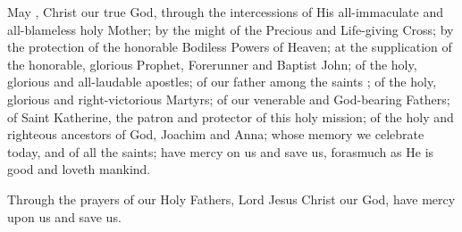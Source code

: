 \documentclass[twoside, letterpaper, 12pt]{report}
\begin{document}
\begin{priest}
\item May , Christ our true God, through the intercessions of His
    all-immaculate and all-blameless holy Mother; by the might of the Precious and Life-giving Cross;
    by the protection of the honorable Bodiless Powers of Heaven;
    at the supplication of the honorable, glorious Prophet, Forerunner and Baptist John;
    of the holy, glorious and all-laudable apostles;
    of our father among the saints
      ;
    of the holy, glorious and right-victorious Martyrs;
    of our venerable and God-bearing Fathers;
    of Saint Katherine, the patron and protector of this holy mission;
    of the holy and righteous ancestors of God, Joachim and Anna;
     whose memory we celebrate today,
    and of all the saints;
    have mercy on us and save us, forasmuch as He is good and loveth mankind.
\item Through the prayers of our Holy Fathers, Lord Jesus Christ our God,
    have mercy upon us and save us.
\end{priest}

\end{document}
